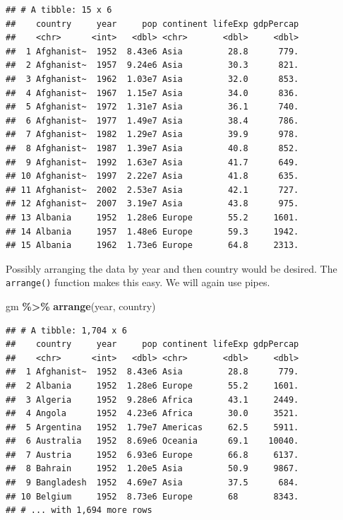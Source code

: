 \documentclass[
]{krantz}
\newenvironment{Shaded}{\begin{snugshade}}{\end{snugshade}}
\newcommand{\KeywordTok}[1]{\textcolor[rgb]{0.13,0.29,0.53}{\textbf{#1}}}
\newcommand{\NormalTok}[1]{#1}
\newcommand{\OperatorTok}[1]{\textcolor[rgb]{0.81,0.36,0.00}{\textbf{#1}}}
\newcommand{\StringTok}[1]{\textcolor[rgb]{0.31,0.60,0.02}{#1}}
\begin{document}
\begin{verbatim}
## # A tibble: 15 x 6
##    country     year     pop continent lifeExp gdpPercap
##    <chr>      <int>   <dbl> <chr>       <dbl>     <dbl>
##  1 Afghanist~  1952  8.43e6 Asia         28.8      779.
##  2 Afghanist~  1957  9.24e6 Asia         30.3      821.
##  3 Afghanist~  1962  1.03e7 Asia         32.0      853.
##  4 Afghanist~  1967  1.15e7 Asia         34.0      836.
##  5 Afghanist~  1972  1.31e7 Asia         36.1      740.
##  6 Afghanist~  1977  1.49e7 Asia         38.4      786.
##  7 Afghanist~  1982  1.29e7 Asia         39.9      978.
##  8 Afghanist~  1987  1.39e7 Asia         40.8      852.
##  9 Afghanist~  1992  1.63e7 Asia         41.7      649.
## 10 Afghanist~  1997  2.22e7 Asia         41.8      635.
## 11 Afghanist~  2002  2.53e7 Asia         42.1      727.
## 12 Afghanist~  2007  3.19e7 Asia         43.8      975.
## 13 Albania     1952  1.28e6 Europe       55.2     1601.
## 14 Albania     1957  1.48e6 Europe       59.3     1942.
## 15 Albania     1962  1.73e6 Europe       64.8     2313.
\end{verbatim}

Possibly arranging the data by year and then country would be desired. The \texttt{arrange()} function makes this easy. We will again use pipes.

\begin{Shaded}
\begin{Highlighting}[]
\NormalTok{gm }\OperatorTok{\%\textgreater{}\%}\StringTok{ }
\StringTok{  }\KeywordTok{arrange}\NormalTok{(year, country)}
\end{Highlighting}
\end{Shaded}

\begin{verbatim}
## # A tibble: 1,704 x 6
##    country     year     pop continent lifeExp gdpPercap
##    <chr>      <int>   <dbl> <chr>       <dbl>     <dbl>
##  1 Afghanist~  1952  8.43e6 Asia         28.8      779.
##  2 Albania     1952  1.28e6 Europe       55.2     1601.
##  3 Algeria     1952  9.28e6 Africa       43.1     2449.
##  4 Angola      1952  4.23e6 Africa       30.0     3521.
##  5 Argentina   1952  1.79e7 Americas     62.5     5911.
##  6 Australia   1952  8.69e6 Oceania      69.1    10040.
##  7 Austria     1952  6.93e6 Europe       66.8     6137.
##  8 Bahrain     1952  1.20e5 Asia         50.9     9867.
##  9 Bangladesh  1952  4.69e7 Asia         37.5      684.
## 10 Belgium     1952  8.73e6 Europe       68       8343.
## # ... with 1,694 more rows
\end{verbatim}
\end{document}
